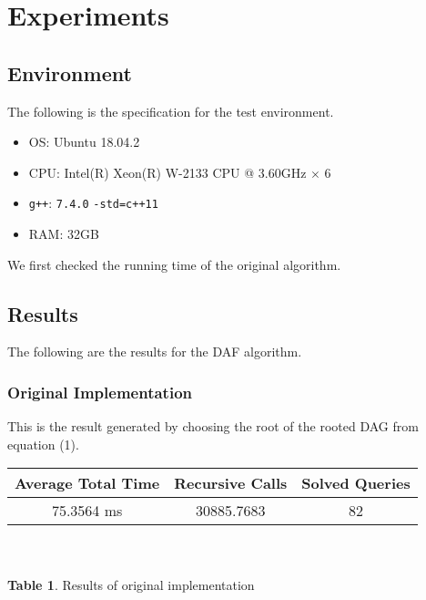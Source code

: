 \documentclass[12pt]{article}
\begin{document}
\section{Experiments}
\subsection{Environment}
The following is the specification for the test environment.
\begin{itemize}
	\item OS: Ubuntu 18.04.2
	\item CPU: Intel(R) Xeon(R) W-2133 CPU @ 3.60GHz $\times$ 6
	\item \texttt{g++}: \texttt{7.4.0} \texttt{-std=c++11}
	\item RAM: 32GB  
\end{itemize}
We first checked the running time of the original algorithm.

\subsection{Results}
The following are the results for the DAF algorithm.
\subsubsection{Original Implementation}
This is the result generated by choosing the root of the rooted DAG from equation (1).
\begin{center}
	\begin{tabular}{|c|c|c|}
		\hline
		Average Total Time & Recursive Calls & Solved Queries  \\ \hline
		75.3564 ms & 30885.7683 & 82\\ \hline 
	\end{tabular}\\~\\
\textbf{Table 1}. Results of original implementation
\end{center}
\end{document}
